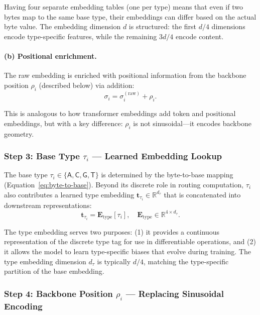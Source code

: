 Having four separate embedding tables (one per type) means that even if two bytes map to the same base type, their embeddings can differ based on the actual byte value. The embedding dimension $d$ is structured: the first $d/4$ dimensions encode type-specific features, while the remaining $3d/4$ encode content.

\paragraph{(b) Positional enrichment.} The raw embedding is enriched with positional information from the backbone position $\rho_i$ (described below) via addition:
\begin{equation}
\sigma_i = \sigma_i^{(\text{raw})} + \rho_i.
\label{eq:sigma-final}
\end{equation}

This is analogous to how transformer embeddings add token and positional embeddings, but with a key difference: $\rho_i$ is not sinusoidal---it encodes backbone geometry.

\subsubsection{Step 3: Base Type $\tau_i$ --- Learned Embedding Lookup}

The base type $\tau_i \in \{\mathsf{A}, \mathsf{C}, \mathsf{G}, \mathsf{T}\}$ is determined by the byte-to-base mapping (Equation~\ref{eq:byte-to-base}). Beyond its discrete role in routing computation, $\tau_i$ also contributes a learned type embedding $\mathbf{t}_{\tau_i} \in \mathbb{R}^{d_\tau}$ that is concatenated into downstream representations:
\begin{equation}
\mathbf{t}_{\tau_i} = \mathbf{E}_{\text{type}}[\tau_i], \quad \mathbf{E}_{\text{type}} \in \mathbb{R}^{4 \times d_\tau}.
\label{eq:type-embedding}
\end{equation}

The type embedding serves two purposes: (1) it provides a continuous representation of the discrete type tag for use in differentiable operations, and (2) it allows the model to learn type-specific biases that evolve during training. The type embedding dimension $d_\tau$ is typically $d/4$, matching the type-specific partition of the base embedding.

\subsubsection{Step 4: Backbone Position $\rho_i$ --- Replacing Sinusoidal Encoding}


